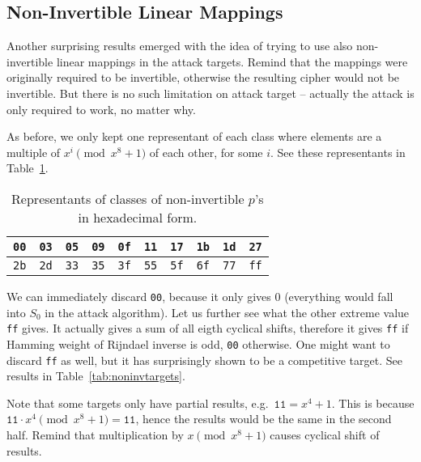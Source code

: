 
\subsection{Non-Invertible Linear Mappings}
\label{sec:noninv}

Another surprising results emerged with the idea of trying to use also non-invertible linear mappings in the attack targets. Remind that the mappings were originally required to be invertible, otherwise the resulting cipher would not be invertible. But there is no such limitation on attack target -- actually the attack is only required to work, no matter why.

As before, we only kept one representant of each class where elements are a multiple of $x^i\pmod{x^8+1}$ of each other, for some $i$. See these representants in Table~\ref{tab:classreprenoninv}.

\begin{table}[h]
	\begin{center}
	\begin{tabular}{| c | c | c | c | c | c | c | c | c | c |}
		\hline
		{\tt 00} & {\tt 03} & {\tt 05} & {\tt 09} & {\tt 0f} & {\tt 11} & {\tt 17} & {\tt 1b} & {\tt 1d} & {\tt 27} \\
		\hline
		{\tt 2b} & {\tt 2d} & {\tt 33} & {\tt 35} & {\tt 3f} & {\tt 55} & {\tt 5f} & {\tt 6f} & {\tt 77} & {\tt ff} \\
		\hline
	\end{tabular}
	\end{center}
\caption{Representants of classes of non-invertible $p$'s in hexadecimal form.}
\label{tab:classreprenoninv}
\end{table}

We can immediately discard {\tt 00}, because it only gives $0$ (everything would fall into $S_0$ in the attack algorithm). Let us further see what the other extreme value {\tt ff} gives. It actually gives a sum of all eigth cyclical shifts, therefore it gives {\tt ff} if Hamming weight of Rijndael inverse is odd, {\tt 00} otherwise. One might want to discard {\tt ff} as well, but it has surprisingly shown to be a competitive target. See results in Table~\ref{tab:noninvtargets}.

Note that some targets only have partial results, e.g.\ $\texttt{11} = x^4+1$. This is because $\texttt{11}\cdot x^4 \pmod{x^8+1} = \texttt{11}$, hence the results would be the same in the second half. Remind that multiplication by $x\pmod{x^8+1}$ causes cyclical shift of results.


